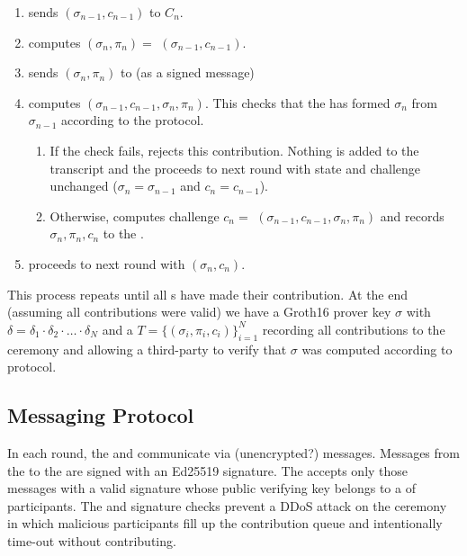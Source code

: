 \begin{enumerate}
\item \Coordinator{} sends $(\sigma_{n-1}, c_{n-1})$ to \Contributor{} $C_n$.
\item \Contributor{} computes $(\sigma_n, \pi_n) = $ \contribute{}$(\sigma_{n-1}, c_{n-1})$.
\item \Contributor{} sends $(\sigma_n, \pi_n)$ to \Coordinator{} (as a signed message)
\item \Coordinator{} computes \verify{}$(\sigma_{n-1}, c_{n-1}, \sigma_n, \pi_n)$. This checks that the \Contributor{} has formed $\sigma_n$ from $\sigma_{n-1}$ according to the protocol.
    \begin{enumerate}
        \item If the check fails, \Coordinator{} rejects this contribution. Nothing is added to the transcript and the \Coordinator{} proceeds to next round with state and challenge unchanged ($\sigma_n = \sigma_{n-1}$ and $c_n = c_{n-1}$).
        \item Otherwise, \Coordinator{} computes challenge $c_n = $ \challenge$(\sigma_{n-1}, c_{n-1}, \sigma_n, \pi_n)$ and records $\sigma_n, \pi_n, c_n$ to the \Transcript{}.
    \end{enumerate}
\item \Coordinator{} proceeds to next round with $(\sigma_n, c_n)$.
\end{enumerate}
This process repeats until all \Contributor{}s have made their contribution. At the end (assuming all contributions were valid) we have a Groth16 prover key $\sigma$ with $\delta = \delta_1 \cdot \delta_2 \cdot \ldots \cdot \delta_N $ and a \Transcript{} $T = \{ (\sigma_i, \pi_i, c_i) \}_{i=1}^N $ recording all contributions to the ceremony and allowing a third-party to verify that $\sigma$ was computed according to protocol.

\subsection{Messaging Protocol}\label{sec: MessagingProtocol}

In each round, the \Coordinator{} and \Contributor{} communicate via (unencrypted?) messages. Messages from the \Contributor{} to the \Coordinator{} are signed with an Ed25519 signature. The \Coordinator{} accepts only those messages with a valid signature whose public verifying key belongs to a \Registry{} of participants. The \Registry{} and signature checks prevent a DDoS attack on the ceremony in which malicious participants fill up the contribution queue and intentionally time-out without contributing.

